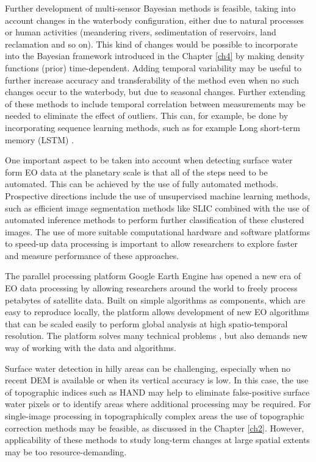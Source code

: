 Further development of multi-sensor Bayesian methods is feasible, taking into account changes in the waterbody configuration, either due to natural processes or human activities (meandering rivers, sedimentation of reservoirs, land reclamation and so on). This kind of changes would be possible to incorporate into the Bayesian framework introduced in the Chapter \ref{ch4} by making density functions (prior) time-dependent. Adding temporal variability may be useful to further increase accuracy and transferability of the method even when no such changes occur to the waterbody, but due to seasonal changes. Further extending of these methods to include temporal correlation between measurements may be needed to eliminate the effect of outliers. This can, for example, be done by incorporating sequence learning methods, such as for example Long short-term memory (LSTM) \citet{hochreiter1997long}.

One important aspect to be taken into account when detecting surface water form \gls{EO} data at the planetary scale is that all of the steps need to be automated. This can be achieved by the use of fully automated methods. Prospective directions include the use of unsupervised machine learning methods, such as efficient image segmentation methods like SLIC \citet{achanta2012slic} combined with the use of automated inference methods to perform further classification of these clustered images. The use of more suitable computational hardware and software platforms to speed-up data processing \citet{donchyts2017slic} is important to allow researchers to explore faster and measure performance of these approaches.

The parallel processing platform Google Earth Engine has opened a new era of \gls{EO} data processing by allowing researchers around the world to freely process petabytes of satellite data. Built on simple algorithms as components, which are easy to reproduce locally, the platform allows development of new \gls{EO} algorithms that can be scaled easily to perform global analysis at high spatio-temporal resolution. The platform solves many technical problems , but also demands new way of working with the data and algorithms.

Surface water detection in hilly areas can be challenging, especially when no recent DEM is available or when its vertical accuracy is low. In this case, the use of topographic indices such as \gls{HAND} \citet{Nobre2011} may help to eliminate false-positive surface water pixels or to identify areas where additional processing may be required. For single-image processing in topographically complex areas the use of topographic correction methods may be feasible, as discussed in the Chapter \ref{ch2}. However, applicability of these methods to study long-term changes at large spatial extents may be too resource-demanding.

